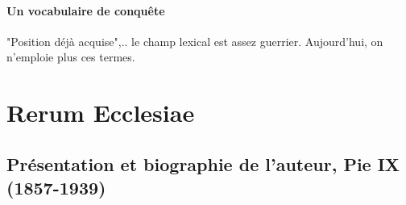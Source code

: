 \paragraph{Un vocabulaire de conquête} "Position déjà acquise",.. le champ lexical est assez guerrier. 
Aujourd'hui, on n'emploie plus ces termes.



\section{Rerum Ecclesiae}


\subsection{Présentation et biographie de l’auteur, Pie IX (1857-1939)}	

